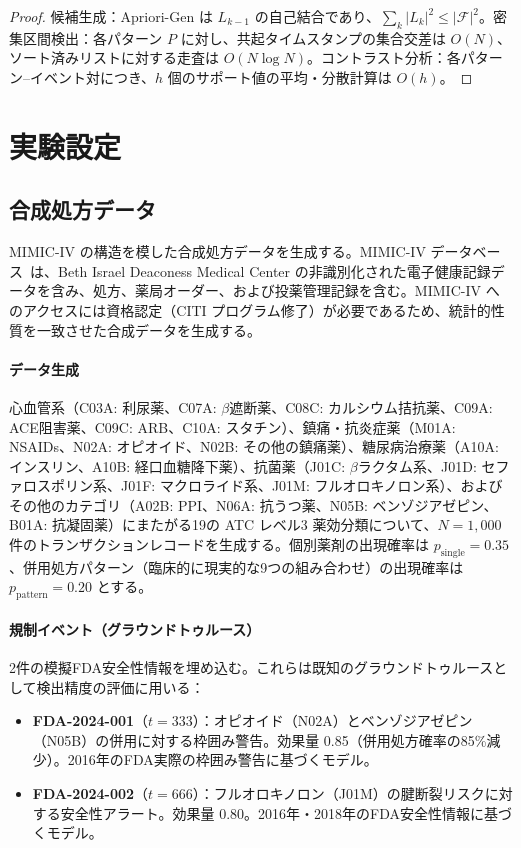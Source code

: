 \documentclass[11pt]{article}
\begin{document}
\begin{proof}
候補生成：Apriori-Gen は $L_{k-1}$ の自己結合であり、$\sum_k |L_k|^2 \leq |\mathcal{F}|^2$。密集区間検出：各パターン $P$ に対し、共起タイムスタンプの集合交差は $O(N)$、ソート済みリストに対する走査は $O(N \log N)$。コントラスト分析：各パターン--イベント対につき、$h$ 個のサポート値の平均・分散計算は $O(h)$。
\end{proof}

\section{実験設定}\label{sec:experiments}

\subsection{合成処方データ}

MIMIC-IV の構造を模した合成処方データを生成する。MIMIC-IV データベース~\citep{johnson2023mimiciv}は、Beth Israel Deaconess Medical Center の非識別化された電子健康記録データを含み、処方、薬局オーダー、および投薬管理記録を含む。MIMIC-IV へのアクセスには資格認定（CITI プログラム修了）が必要であるため、統計的性質を一致させた合成データを生成する。

\paragraph{データ生成}
心血管系（C03A: 利尿薬、C07A: $\beta$遮断薬、C08C: カルシウム拮抗薬、C09A: ACE阻害薬、C09C: ARB、C10A: スタチン）、鎮痛・抗炎症薬（M01A: NSAIDs、N02A: オピオイド、N02B: その他の鎮痛薬）、糖尿病治療薬（A10A: インスリン、A10B: 経口血糖降下薬）、抗菌薬（J01C: $\beta$ラクタム系、J01D: セファロスポリン系、J01F: マクロライド系、J01M: フルオロキノロン系）、およびその他のカテゴリ（A02B: PPI、N06A: 抗うつ薬、N05B: ベンゾジアゼピン、B01A: 抗凝固薬）にまたがる19の ATC レベル3 薬効分類について、$N = 1{,}000$ 件のトランザクションレコードを生成する。個別薬剤の出現確率は $p_{\mathrm{single}} = 0.35$、併用処方パターン（臨床的に現実的な9つの組み合わせ）の出現確率は $p_{\mathrm{pattern}} = 0.20$ とする。

\paragraph{規制イベント（グラウンドトゥルース）}
2件の模擬FDA安全性情報を埋め込む。これらは既知のグラウンドトゥルースとして検出精度の評価に用いる：
\begin{itemize}
\item \textbf{FDA-2024-001}（$t = 333$）：オピオイド（N02A）とベンゾジアゼピン（N05B）の併用に対する枠囲み警告。効果量 0.85（併用処方確率の85\%減少）。2016年のFDA実際の枠囲み警告に基づくモデル。
\item \textbf{FDA-2024-002}（$t = 666$）：フルオロキノロン（J01M）の腱断裂リスクに対する安全性アラート。効果量 0.80。2016年・2018年のFDA安全性情報に基づくモデル。
\end{itemize}
\end{document}
